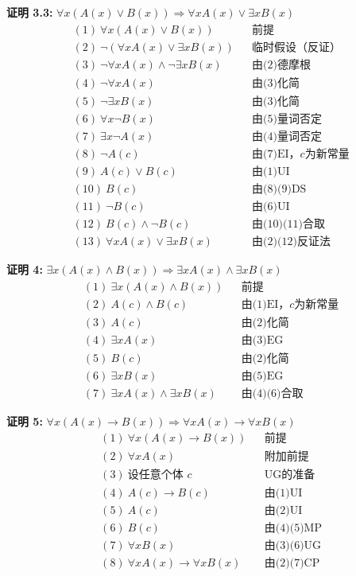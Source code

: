 \noindent
\textbf{证明 3.3:} $\forall x(A(x)\lor B(x))\Rightarrow \forall xA(x)\lor \exists xB(x)$
\vspace{-10pt}
\begin{align*}
&(1)\ \forall x(A(x)\lor B(x)) && \text{前提} \\
&(2)\ \neg(\forall xA(x) \lor \exists xB(x)) && \text{临时假设（反证）} \\
&(3)\ \neg\forall xA(x) \land \neg\exists xB(x) && \text{由(2)德摩根} \\
&(4)\ \neg\forall xA(x) && \text{由(3)化简} \\
&(5)\ \neg\exists xB(x) && \text{由(3)化简} \\
&(6)\ \forall x\neg B(x) && \text{由(5)量词否定} \\
&(7)\ \exists x\neg A(x) && \text{由(4)量词否定} \\
&(8)\ \neg A(c) && \text{由(7)EI，$c$为新常量} \\
&(9)\ A(c) \lor B(c) && \text{由(1)UI} \\
&(10)\ B(c) && \text{由(8)(9)DS} \\
&(11)\ \neg B(c) && \text{由(6)UI} \\
&(12)\ B(c) \land \neg B(c) && \text{由(10)(11)合取} \\
&(13)\ \forall xA(x) \lor \exists xB(x) && \text{由(2)(12)反证法}
\end{align*}

\noindent
\textbf{证明 4:} $\exists x(A(x)\land B(x))\Rightarrow \exists xA(x)\land \exists xB(x)$
\vspace{-10pt}
\begin{align*}
&(1)\ \exists x(A(x)\land B(x)) && \text{前提} \\
&(2)\ A(c) \land B(c) && \text{由(1)EI，$c$为新常量} \\
&(3)\ A(c) && \text{由(2)化简} \\
&(4)\ \exists xA(x) && \text{由(3)EG} \\
&(5)\ B(c) && \text{由(2)化简} \\
&(6)\ \exists xB(x) && \text{由(5)EG} \\
&(7)\ \exists xA(x) \land \exists xB(x) && \text{由(4)(6)合取}
\end{align*}

\noindent
\textbf{证明 5:} $\forall x(A(x)\to B(x))\Rightarrow \forall xA(x)\to \forall xB(x)$
\vspace{-10pt}
\begin{align*}
&(1)\ \forall x(A(x)\to B(x)) && \text{前提} \\
&(2)\ \forall xA(x) && \text{附加前提} \\
&(3)\ \text{设任意个体 $c$} && \text{UG的准备} \\
&(4)\ A(c) \to B(c) && \text{由(1)UI} \\
&(5)\ A(c) && \text{由(2)UI} \\
&(6)\ B(c) && \text{由(4)(5)MP} \\
&(7)\ \forall xB(x) && \text{由(3)(6)UG} \\
&(8)\ \forall xA(x) \to \forall xB(x) && \text{由(2)(7)CP}
\end{align*}

